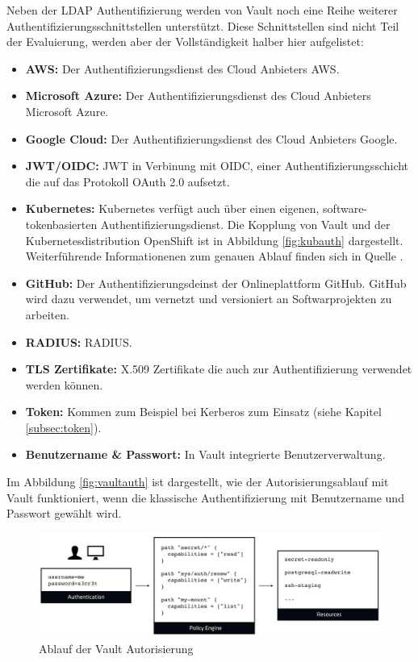 \documentclass[
book,
a4paper,   
titlepage,  
halfparskip,
12pt        
]{scrartcl}
\begin{document}
\begin{onehalfspacing}
Neben der LDAP Authentifizierung werden von Vault noch eine Reihe weiterer Authentifizierungsschnittstellen unterstützt. Diese Schnittstellen sind nicht Teil der Evaluierung, werden aber der Vollständigkeit halber hier aufgelistet:\cite{vaultauth}
\begin{itemize}
	\item \textbf{\ac{AWS}:} Der Authentifizierungsdienst des Cloud Anbieters \ac{AWS}.
	\item \textbf{Microsoft Azure:} Der Authentifizierungsdienst des Cloud Anbieters Microsoft Azure.
	\item \textbf{Google Cloud:} Der Authentifizierungsdienst des Cloud Anbieters Google.
	\item \textbf{\acs{JWT}/\acs{OIDC}:} \ac{JWT} in Verbinung mit \ac{OIDC}, einer Authentifizierungsschicht die auf das Protokoll OAuth 2.0 aufsetzt.
	\item \textbf{Kubernetes:} Kubernetes verfügt auch über einen eigenen, software-tokenbasierten Authentifizierungsdienst. Die Kopplung von Vault und der Kubernetesdistribution OpenShift ist in Abbildung \vref{fig:kubauth} dargestellt. Weiterführende Informationenen zum genauen Ablauf finden sich in Quelle \cite{kubauth}.
	\item \textbf{GitHub:} Der Authentifizierungsdeinst der Onlineplattform GitHub. GitHub wird dazu verwendet, um vernetzt und versioniert an Softwarprojekten zu arbeiten.\cite{githubs}
	\item \textbf{\acs{RADIUS}:} \ac{RADIUS}.
	\item \textbf{\acs{TLS} Zertifikate:} X.509 Zertifikate die auch zur Authentifizierung verwendet werden können.
	\item \textbf{Token:} Kommen zum Beispiel bei Kerberos zum Einsatz (siehe Kapitel \vref{subsec:token}).
	\item \textbf{Benutzername \& Passwort:} In Vault integrierte Benutzerverwaltung.
\end{itemize}

Im Abbildung \vref{fig:vaultauth} ist dargestellt, wie der Autorisierungsablauf mit Vault funktioniert, wenn die klassische Authentifizierung mit Benutzername und Passwort gewählt wird.

\begin{figure}[h]
	\centering
	\includegraphics[width=1\linewidth]{vaultauth.jpg}
	\caption[Vault Autorisierung]{Ablauf der Vault Autorisierung \cite{vaultauth2}}
	\label{fig:vaultauth}
\end{figure}


\end{onehalfspacing}
\end{document}

